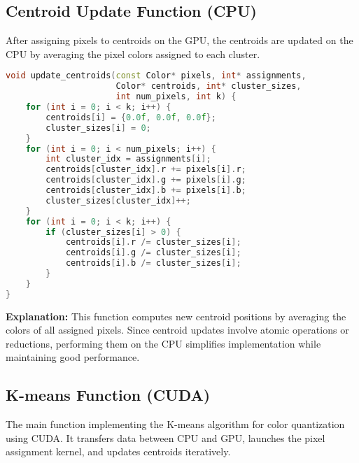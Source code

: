 \subsection{Centroid Update Function (CPU)}
After assigning pixels to centroids on the GPU, the centroids are updated on the CPU by averaging the pixel colors assigned to each cluster.

\begin{lstlisting}[language=C++]
void update_centroids(const Color* pixels, int* assignments, 
                      Color* centroids, int* cluster_sizes, 
                      int num_pixels, int k) {
    for (int i = 0; i < k; i++) {
        centroids[i] = {0.0f, 0.0f, 0.0f};  
        cluster_sizes[i] = 0;
    }
    for (int i = 0; i < num_pixels; i++) {
        int cluster_idx = assignments[i];
        centroids[cluster_idx].r += pixels[i].r;
        centroids[cluster_idx].g += pixels[i].g;
        centroids[cluster_idx].b += pixels[i].b;
        cluster_sizes[cluster_idx]++;
    }
    for (int i = 0; i < k; i++) {
        if (cluster_sizes[i] > 0) {
            centroids[i].r /= cluster_sizes[i];
            centroids[i].g /= cluster_sizes[i];
            centroids[i].b /= cluster_sizes[i];
        }
    }
}
\end{lstlisting}

\textbf{Explanation:}
This function computes new centroid positions by averaging the colors of all assigned pixels. Since centroid updates involve atomic operations or reductions, performing them on the CPU simplifies implementation while maintaining good performance.

\subsection{K-means Function (CUDA)}
The main function implementing the K-means algorithm for color quantization using CUDA. It transfers data between CPU and GPU, launches the pixel assignment kernel, and updates centroids iteratively.

